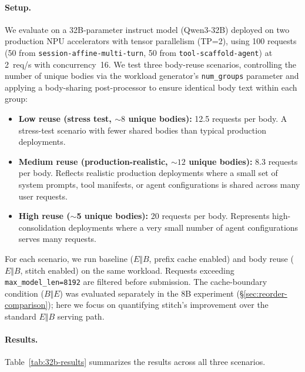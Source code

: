 \documentclass[conference]{IEEEtran}
\begin{document}
\paragraph{Setup.}
We evaluate on a 32B-parameter instruct model (Qwen3-32B) deployed on two production NPU accelerators with tensor parallelism (TP=2), using 100 requests (50 from \texttt{session-affine-multi-turn}, 50 from \texttt{tool-scaffold-agent}) at 2~req/s with concurrency~16. We test three body-reuse scenarios, controlling the number of unique bodies via the workload generator's \texttt{num\_groups} parameter and applying a body-sharing post-processor to ensure identical body text within each group:
\begin{itemize}
 \item \textbf{Low reuse (stress test, ${\sim}8$ unique bodies):} 12.5 requests per body. A stress-test scenario with fewer shared bodies than typical production deployments.
 \item \textbf{Medium reuse (production-realistic, ${\sim}12$ unique bodies):} 8.3 requests per body. Reflects realistic production deployments where a small set of system prompts, tool manifests, or agent configurations is shared across many user requests.
 \item \textbf{High reuse ($\sim$5 unique bodies):} 20 requests per body. Represents high-consolidation deployments where a very small number of agent configurations serves many requests.
\end{itemize}
For each scenario, we run baseline ($E \Vert B$, prefix cache enabled) and body reuse ($E \Vert B$, stitch enabled) on the same workload. Requests exceeding \texttt{max\_model\_len=8192} are filtered before submission. The cache-boundary condition ($B \Vert E$) was evaluated separately in the 8B experiment (\S\ref{sec:reorder-comparison}); here we focus on quantifying stitch's improvement over the standard $E \Vert B$ serving path.

\paragraph{Results.}
Table~\ref{tab:32b-results} summarizes the results across all three scenarios.
\end{document}
